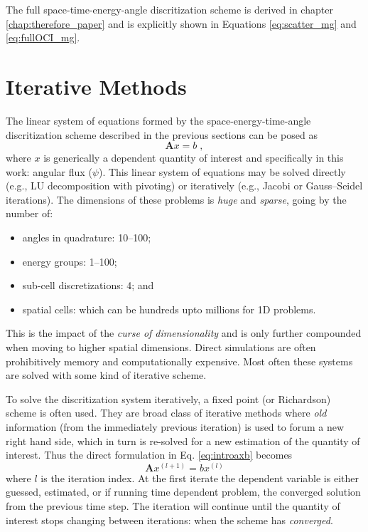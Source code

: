 The full space-time-energy-angle discritization scheme is derived in chapter \ref{chap:therefore_paper} and is explicitly shown in Equations \eqref{eq:scatter_mg} and \eqref{eq:fullOCI_mg}.

\section{Iterative Methods}

The linear system of equations formed by the space-energy-time-angle discritization scheme described in the previous sections can be posed as
\begin{equation}
\label{eq:introaxb}
    \bm{A}x=b \; ,
\end{equation}
where $x$ is generically a dependent quantity of interest and specifically in this work: angular flux ($\psi$). 
This linear system of equations may be solved directly (e.g., LU decomposition with pivoting) or iteratively (e.g., Jacobi or Gauss--Seidel iterations).
The dimensions of these problems is \emph{huge} and \emph{sparse}, going by the number of:
\begin{itemize}
    \item angles in quadrature: \num{10}--\num{100};
    \item energy groups: \num{1}--\num{100};
    \item sub-cell discretizations: 4; and
    \item spatial cells: which can be hundreds upto millions for 1D problems.
\end{itemize}
This is the impact of the \emph{curse of dimensionality} and is only further compounded when moving to higher spatial dimensions. 
Direct simulations are often prohibitively memory and computationally expensive.
Most often these systems are solved with some kind of iterative scheme.

To solve the discritization system iteratively, a fixed point (or Richardson) scheme is often used.
They are broad class of iterative methods where \emph{old} information (from the immediately previous iteration) is used to forum a new right hand side, which in turn is re-solved for a new estimation of the quantity of interest.
Thus the direct formulation in Eq. \eqref{eq:introaxb} becomes
\begin{equation}
\label{eq:introopsplit}
    \bm{A}x^{(l+1)} = b x^{(l)}
\end{equation}
where $l$ is the iteration index.
At the first iterate the dependent variable is either guessed, estimated, or if running time dependent problem, the converged solution from the previous time step.
The iteration will continue until the quantity of interest stops changing between iterations: when the scheme has \emph{converged}.

